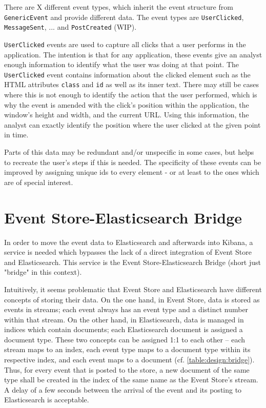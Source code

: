 There are X different event types, which inherit the event structure from \texttt{GenericEvent} and provide different data.
The event types are \texttt{UserClicked}, \texttt{MessageSent}, ... and \texttt{PostCreated} (WIP).

\texttt{UserClicked} events are used to capture all clicks that a user performs in the application.
The intention is that for any application, these events give an analyst enough information to identify what the user was doing at that point.
The \texttt{UserClicked} event contains information about the clicked element such as the HTML attributes \texttt{class} and \texttt{id} as well as its inner text.
There may still be cases where this is not enough to identify the action that the user performed, which is why the event is amended with the click's position within the application, the window's height and width, and the current URL.
Using this information, the analyst can exactly identify the position where the user clicked at the given point in time.

Parts of this data may be redundant and/or unspecific in some cases, but helps to recreate the user's steps if this is needed.
The specificity of these events can be improved by assigning unique ids to every element - or at least to the ones which are of special interest.

\section{Event Store-Elasticsearch Bridge}
\label{sec:design:bridge}

In order to move the event data to Elasticsearch and afterwards into Kibana, a service is needed which bypasses the lack of a direct integration of Event Store and Elasticsearch.
This service is the Event Store-Elasticsearch Bridge (short just "bridge" in this context).


Intuitively, it seems problematic that Event Store and Elasticsearch have different concepts of storing their data.
On the one hand, in Event Store, data is stored as events in streams; each event always has an event type and a distinct number within that stream.
On the other hand, in Elasticsearch, data is managed in indices which contain documents; each Elasticsearch document is assigned a document type.
These two concepts can be assigned 1:1 to each other -- each stream maps to an index, each event type maps to a document type within its respective index, and each event maps to a document (cf. \cref{table:design:bridge}).
Thus, for every event that is posted to the store, a new document of the same type shall be created in the index of the same name as the Event Store's stream.
A delay of a few seconds between the arrival of the event and its posting to Elasticsearch is acceptable.

